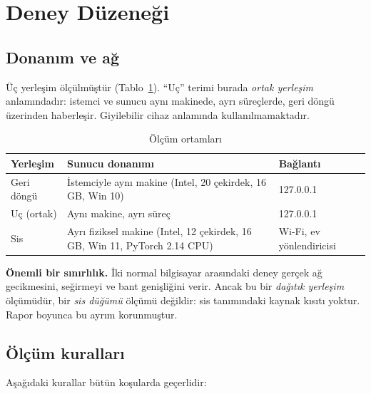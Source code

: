 \documentclass[conference]{IEEEtran}
\begin{document}
\section{Deney Düzeneği}

\subsection{Donanım ve ağ}

Üç yerleşim ölçülmüştür (Tablo~\ref{tab:donanim}). ``Uç'' terimi burada
\emph{ortak yerleşim} anlamındadır: istemci ve sunucu aynı makinede, ayrı
süreçlerde, geri döngü üzerinden haberleşir. Giyilebilir cihaz anlamında
kullanılmamaktadır.

\begin{table}[t]
\caption{Ölçüm ortamları}
\label{tab:donanim}
\centering
\small
\begin{tabular}{p{1.3cm}p{3.1cm}p{2.7cm}}
\toprule
\textbf{Yerleşim} & \textbf{Sunucu donanımı} & \textbf{Bağlantı}\\
\midrule
Geri döngü & İstemciyle aynı makine (Intel, 20 çekirdek, 16\,GB, Win 10) & 127.0.0.1\\
Uç (ortak) & Aynı makine, ayrı süreç & 127.0.0.1\\
Sis & Ayrı fiziksel makine (Intel, 12 çekirdek, 16\,GB, Win 11, PyTorch 2.14 CPU) & Wi-Fi, ev yönlendiricisi\\
\bottomrule
\end{tabular}
\end{table}

\textbf{Önemli bir sınırlılık.} İki normal bilgisayar arasındaki deney gerçek ağ
gecikmesini, seğirmeyi ve bant genişliğini verir. Ancak bu bir \emph{dağıtık
yerleşim} ölçümüdür, bir \emph{sis düğümü} ölçümü değildir: sis tanımındaki
kaynak kısıtı yoktur. Rapor boyunca bu ayrım korunmuştur.

\subsection{Ölçüm kuralları}

Aşağıdaki kurallar bütün koşularda geçerlidir:
\end{document}
